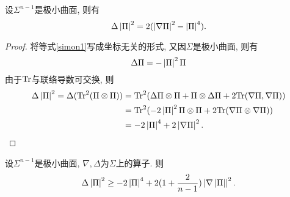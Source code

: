 \begin{proposition}[Simons等式] \label{simon_equation}
    设$\Sigma^{n-1}$是极小曲面, 则有
    \begin{equation}
        \Delta\left | {\Pi} \right |^2 = 2(\left | \nabla {\Pi} \right |^2-\left | {\Pi} \right |^4).
    \end{equation}
\end{proposition}
\begin{proof}
    将等式\eqref{simon1}写成坐标无关的形式, 又因$\Sigma$是极小曲面, 则有
    \begin{equation}
        \Delta {\Pi} = -\left | {\Pi} \right |^2 {\Pi}
    \end{equation}
    由于$\text{Tr}$与联络导数可交换, 则
    \begin{equation}
        \begin{split}
            \Delta \left | {\Pi} \right |^2 = \Delta (\text{Tr}^2({\Pi}\otimes{\Pi})) &= \text{Tr}^2(\Delta {\Pi} \otimes{\Pi} + {\Pi} \otimes \Delta {\Pi} + 2 \text{Tr}(\nabla {\Pi}, \nabla {\Pi})) \\
            &=\text{Tr}^2(-2\left | {\Pi} \right |^2 {\Pi}\otimes{\Pi}+2\text{Tr}(\nabla {\Pi} \otimes \nabla {\Pi})) \\
            &=-2\left | {\Pi} \right |^4+2\left | \nabla {\Pi} \right |^2.
        \end{split}
    \end{equation}
\end{proof}
\begin{proposition}[Simons不等式]
    设$\Sigma^{n-1}$是极小曲面, $\nabla,\Delta$为$\Sigma$上的算子. 则
    \begin{equation} \label{simon_inequality}
        \Delta \left | {\Pi} \right |^2 \ge -2\left | {\Pi} \right |^4+2(1+\frac{2}{n-1})\left | \nabla \left | {\Pi} \right | \right |^2.
    \end{equation}
\end{proposition}
